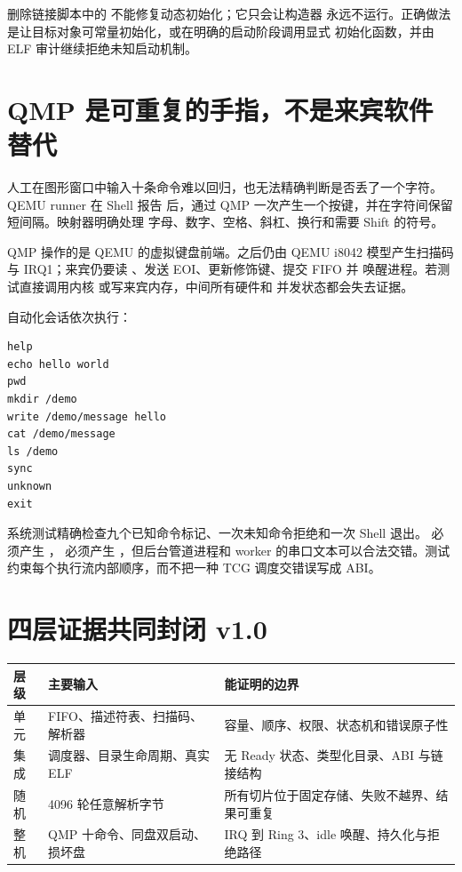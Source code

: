 \begin{failurebox}
删除链接脚本中的  不能修复动态初始化；它只会让构造器
永远不运行。正确做法是让目标对象可常量初始化，或在明确的启动阶段调用显式
初始化函数，并由 ELF 审计继续拒绝未知启动机制。
\end{failurebox}

\section{QMP 是可重复的手指，不是来宾软件替代}

人工在图形窗口中输入十条命令难以回归，也无法精确判断是否丢了一个字符。
QEMU runner 在 Shell 报告  后，通过 QMP
 一次产生一个按键，并在字符间保留短间隔。映射器明确处理
字母、数字、空格、斜杠、换行和需要 Shift 的符号。

QMP 操作的是 QEMU 的虚拟键盘前端。之后仍由 QEMU i8042 模型产生扫描码与
IRQ1；来宾仍要读 、发送 EOI、更新修饰键、提交 FIFO 并
唤醒进程。若测试直接调用内核  或写来宾内存，中间所有硬件和
并发状态都会失去证据。

自动化会话依次执行：

\begin{lstlisting}
help
echo hello world
pwd
mkdir /demo
write /demo/message hello
cat /demo/message
ls /demo
sync
unknown
exit
\end{lstlisting}

系统测试精确检查九个已知命令标记、一次未知命令拒绝和一次 Shell 退出。
 必须产生 ， 必须产生
，但后台管道进程和 worker 的串口文本可以合法交错。测试
约束每个执行流内部顺序，而不把一种 TCG 调度交错误写成 ABI。

\section{四层证据共同封闭 v1.0}

\begin{longtable}{L{0.19\textwidth}L{0.31\textwidth}L{0.36\textwidth}}
\toprule
层级 & 主要输入 & 能证明的边界\\
\midrule
单元 & FIFO、描述符表、扫描码、解析器 & 容量、顺序、权限、状态机和错误原子性\\
集成 & 调度器、目录生命周期、真实 ELF & 无 Ready 状态、类型化目录、ABI 与链接结构\\
随机 & 4096 轮任意解析字节 & 所有切片位于固定存储、失败不越界、结果可重复\\
整机 & QMP 十命令、同盘双启动、损坏盘 & IRQ 到 Ring 3、idle 唤醒、持久化与拒绝路径\\
\bottomrule
\end{longtable}

